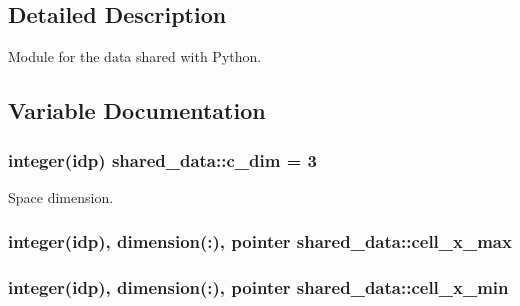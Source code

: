 \subsection{Detailed Description}
Module for the data shared with Python. 

\subsection{Variable Documentation}
\subsubsection[{\texorpdfstring{c\+\_\+dim}{c_dim}}]{\setlength{\rightskip}{0pt plus 5cm}integer(idp) shared\+\_\+data\+::c\+\_\+dim = 3}\hypertarget{namespaceshared__data_a9dcd30bdab987f8957482cbd80ba40b3}{}\label{namespaceshared__data_a9dcd30bdab987f8957482cbd80ba40b3}


Space dimension. 

\subsubsection[{\texorpdfstring{cell\+\_\+x\+\_\+max}{cell_x_max}}]{\setlength{\rightskip}{0pt plus 5cm}integer(idp), dimension(\+:), pointer shared\+\_\+data\+::cell\+\_\+x\+\_\+max}\hypertarget{namespaceshared__data_a560a198cff32066380eaf1263719724d}{}\label{namespaceshared__data_a560a198cff32066380eaf1263719724d}
\subsubsection[{\texorpdfstring{cell\+\_\+x\+\_\+min}{cell_x_min}}]{\setlength{\rightskip}{0pt plus 5cm}integer(idp), dimension(\+:), pointer shared\+\_\+data\+::cell\+\_\+x\+\_\+min}\hypertarget{namespaceshared__data_a2bcdae01850fe7a172972cd09651522b}{}\label{namespaceshared__data_a2bcdae01850fe7a172972cd09651522b}
